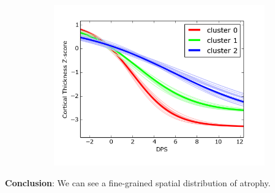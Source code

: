 \documentclass[10pt,xcolor=table]{beamer}
\begin{document}
\begin{frame}
\begin{figure}[h]
\begin{subfigure}[b]{0.3\textwidth}
  \end{subfigure}
    \begin{subfigure}[b]{0.3\textwidth}
    \centering
    \includegraphics[width=\scalingFactorTraj\textwidth]{../images/vwdpm/trajSamplesOneFig_drcThavgFWHM0InithistCl3Pr0Ra1_VWDPMStdPCA.png}
  \end{subfigure}
  

\end{figure}

\textbf{Conclusion}: We can see a fine-grained spatial distribution of atrophy.

\end{frame}
\end{document}
